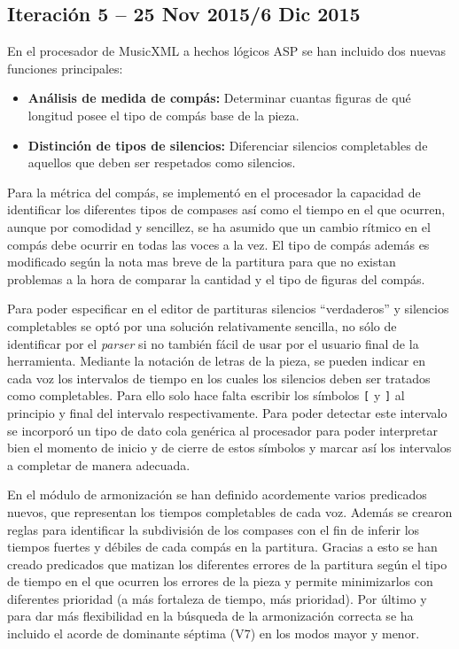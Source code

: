 \subsection{Iteración 5 -- 25 Nov 2015/6 Dic 2015}
\label{subsec:fifth_iteration}
En el procesador de MusicXML a hechos lógicos ASP se han incluido dos nuevas funciones principales: 
\begin{itemize}
	\item \textbf{Análisis de medida de compás:} Determinar cuantas figuras de qué longitud posee el tipo de compás base de la pieza.
	\item \textbf{Distinción de tipos de silencios:} Diferenciar silencios completables de aquellos que deben ser respetados como silencios.
\end{itemize}

Para la métrica del compás, se implementó en el procesador la capacidad de identificar los diferentes tipos de compases así como el tiempo en el que ocurren, aunque por comodidad y sencillez, se ha asumido que un cambio rítmico en el compás debe ocurrir en todas las voces a la vez. El tipo de compás además es modificado según la nota mas breve de la partitura para que no existan problemas a la hora de comparar la cantidad y el tipo de figuras del compás.

Para poder especificar en el editor de partituras silencios ``verdaderos'' y silencios completables se optó por una solución relativamente sencilla, no sólo de identificar por el \textit{parser} si no también fácil de usar por el usuario final de la herramienta. Mediante la notación de letras de la pieza, se pueden indicar en cada voz los intervalos de tiempo en los cuales los silencios deben ser tratados como completables. Para ello solo hace falta escribir los símbolos \texttt{[} y \texttt{]} al principio y final del intervalo respectivamente. Para poder detectar este intervalo se incorporó un tipo de dato cola genérica al procesador para poder interpretar bien el momento de inicio y de cierre de estos símbolos y marcar así los intervalos a completar de manera adecuada.

En el módulo de armonización se han definido acordemente varios predicados nuevos, que representan los tiempos completables de cada voz. Además se crearon reglas para identificar la subdivisión de los compases con el fin de inferir los tiempos fuertes y débiles de cada compás en la partitura. Gracias a esto se han creado predicados que matizan los diferentes errores de la partitura según el tipo de tiempo en el que ocurren los errores de la pieza y permite minimizarlos con diferentes prioridad (a más fortaleza de tiempo, más prioridad). Por último y para dar más flexibilidad en la búsqueda de la armonización correcta se ha incluido el acorde de dominante séptima (V7) en los modos mayor y menor.

